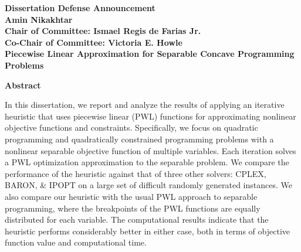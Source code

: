 \documentclass[14pt]{article}
\begin{document}

\begin{center}
    \textbf{Dissertation Defense Announcement}\\
    \textbf{Amin Nikakhtar}\\
    \textbf{Chair of Committee: Ismael Regis de Farias Jr.}\\
    \textbf{Co-Chair of Committee: Victoria E. Howle}\\
    \textbf{Piecewise Linear Approximation for Separable Concave Programming Problems}\\
\end{center}
\textbf{Abstract}\\
\par In this dissertation, we report and analyze the results of applying an iterative heuristic that uses piecewise linear (PWL) functions for approximating nonlinear objective functions and constraints. Specifically, we focus on quadratic programming and quadratically constrained programming problems with a nonlinear separable objective function of multiple variables. Each iteration solves a PWL optimization approximation to the separable problem. We compare the performance of the heuristic against that of three other solvers: CPLEX, BARON, \& IPOPT on a large set of difficult randomly generated instances. We also compare our heuristic with the usual PWL approach to separable programming, where the breakpoints of the PWL functions are equally distributed for each variable. The computational results indicate that the heuristic performs considerably better in either case, both in terms of objective function value and computational time.    
\end{document}

